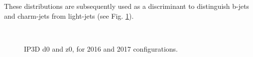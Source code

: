             These distributions are subsequently used as a discriminant to distinguish b-jets and charm-jets from light-jets
                (see Fig. \ref{fig:ip3dsig})\cite{thesis_giacinto}.

            \begin{figure}
                \\
                \caption{
                    IP3D d0 and z0, for 2016 and 2017 configurations\cite{btagging_optimisation}.
                }
                \label{fig:ip3dsig}
            \end{figure}


        \FloatBarrier


